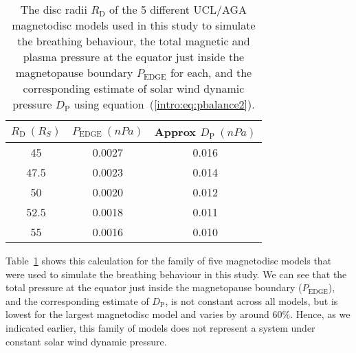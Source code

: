 \begin{table}
\caption[Model radii and solar wind dynamic pressure estimates for breathing magnetodisc models.]{The disc radii $R_\mathrm{D}$ of the 5 different UCL/AGA magnetodisc models used in this study to simulate the breathing behaviour, the total magnetic and plasma pressure at the equator just inside the magnetopause boundary $P_\mathrm{EDGE}$ for each, and the corresponding estimate of solar wind dynamic pressure $D_\mathrm{P}$ using equation~(\ref{intro:eq:pbalance2}).}
\label{equinox:table:EdgePs}
\centering
\begin{tabular}{c c c}
\hline
$R_\mathrm{D}~(\si{R_S})$ & $P_\mathrm{EDGE}~(\si{nPa})$ & Approx $D_\mathrm{P}~(\si{nPa})$\\
\hline
45 & 0.0027 & 0.016 \\
47.5 & 0.0023 & 0.014\\
50 & 0.0020 & 0.012 \\
52.5 & 0.0018 & 0.011 \\
55 & 0.0016 & 0.010 \\
\hline
\end{tabular}
\end{table}

Table~\ref{equinox:table:EdgePs} shows this calculation for the family of five magnetodisc models that were used to simulate the breathing behaviour in this study. We can see that the total pressure at the equator just inside the magnetopause boundary ($P_\mathrm{EDGE}$), and the corresponding estimate of $D_\mathrm{P}$, is not constant across all models, but is lowest for the largest magnetodisc model and varies by around 60\%. Hence, as we indicated earlier, this family of models does not represent a system under constant solar wind dynamic pressure.

